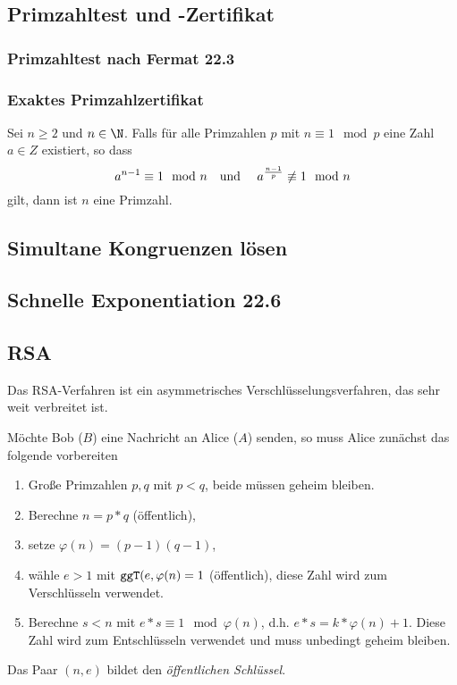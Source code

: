 \subsection{Primzahltest und -Zertifikat}
\subsubsection{Primzahltest nach Fermat 22.3}

\subsubsection{Exaktes Primzahlzertifikat}
Sei $n\geq 2$ und $n\in\N$. Falls für alle Primzahlen $p$ mit $n\equiv 1\mod p$ eine Zahl $a\in Z$ existiert, so dass
\begin{equation*}
 	a^{n-1}\equiv 1\mod n \text{\quad und \quad}a^{\frac{n-1}p}\not\equiv 1\mod n
\end{equation*}
gilt, dann ist $n$ eine Primzahl. 

\subsection{Simultane Kongruenzen lösen}
\subsection{Schnelle Exponentiation 22.6}
\subsection{RSA}
Das RSA-Verfahren ist ein asymmetrisches Verschlüsselungsverfahren, das sehr weit verbreitet ist.

Möchte Bob  ($B$) eine Nachricht an Alice ($A$) senden, so muss Alice zunächst das folgende vorbereiten 
\begin{enumerate}
	\item Große Primzahlen $p,q$ mit $p<q$, beide müssen geheim bleiben.
	\item Berechne $n=p*q$ (öffentlich),
	\item setze $\varphi(n)=(p-1)(q-1)$,
	\item wähle $e>1$ mit $\texttt{ggT}(e,\varphi(n)=1$ (öffentlich), diese Zahl wird zum Verschlüsseln verwendet.
	\item Berechne $s<n$ mit $e*s\equiv 1\mod \varphi(n)$, d.h. $e*s=k*\varphi(n)+1$. Diese Zahl wird zum Entschlüsseln verwendet und muss unbedingt geheim bleiben.
\end{enumerate}
Das Paar $(n,e)$ bildet den \emph{öffentlichen Schlüssel}.

